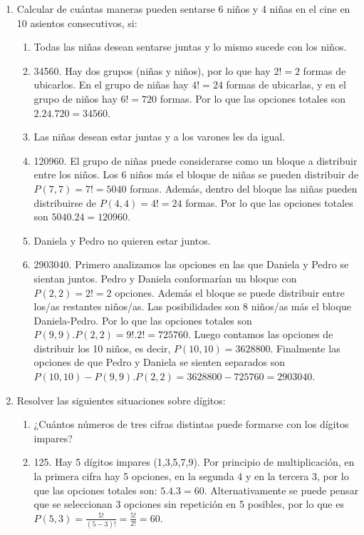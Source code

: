 \documentclass[a4paper]{article}
\newcommand{\answer}{\item[**]}
\newcommand{\exercise}{\item}
\begin{document}
\begin{enumerate}
\begin{enumerate} [label=(\alph*)]
	\end{enumerate}

	\exercise Calcular de cuántas maneras pueden sentarse 6 niños y 4 niñas en el cine en 10 asientos consecutivos, si:
	\begin{enumerate} [label=(\alph*)]
		\item Todas las niñas desean sentarse juntas y lo mismo sucede con los niños.
		\answer 34560. Hay dos grupos (niñas y niños), por lo que hay $2!=2$ formas de ubicarlos. En el grupo de niñas hay $4!=24$ formas de ubicarlas, y en el grupo de niños hay $6!=720$ formas. Por lo que las opciones totales son $2.24.720=34560$.

		\item Las niñas desean estar juntas y a los varones les da igual.
		\answer 120960. El grupo de niñas puede considerarse como un bloque a distribuir entre los niños. Los 6 niños más el bloque de niñas se pueden distribuir de $P(7,7)=7!=5040$ formas. Además, dentro del bloque las niñas pueden distribuirse de $P(4,4)=4!=24$ formas. Por lo que las opciones totales son $5040.24=120960$.

		\item Daniela y Pedro no quieren estar juntos.
		\answer 2903040. Primero analizamos las opciones en las que Daniela y Pedro se sientan juntos. Pedro y Daniela conformarían un bloque con $P(2,2)=2!=2$ opciones. Además el bloque se puede distribuir entre los/as restantes niños/as. Las posibilidades son 8 niños/as más el bloque Daniela-Pedro. Por lo que las opciones totales son $P(9,9).P(2,2)=9!.2!=725760$. Luego contamos las opciones de distribuir los 10 niños, es decir, $P(10,10)=3628800$. Finalmente las opciones de que Pedro y Daniela se sienten separados son $P(10,10)-P(9,9).P(2,2)=3628800-725760=2903040$.

	\end{enumerate}

	\exercise Resolver las siguientes situaciones sobre dígitos:
	\begin{enumerate} [label=(\alph*)]
		\item ¿Cuántos números de tres cifras distintas puede formarse con los dígitos impares?
		\answer 125. Hay 5 dígitos impares (1,3,5,7,9). Por principio de multiplicación, en la primera cifra hay 5 opciones, en la segunda 4 y en la tercera 3, por lo que las opciones totales son: $5.4.3 = 60$. Alternativamente se puede pensar que se seleccionan 3 opciones sin repetición en 5 posibles, por lo que es $P(5,3)=\frac{5!}{(5-3)!}=\frac{5!}{2!}=60$.


\end{enumerate}
\end{enumerate}
\end{document}
